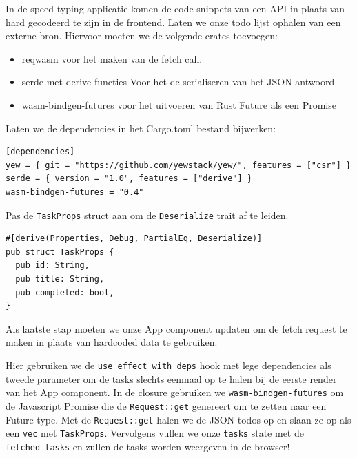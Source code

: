 In de speed typing applicatie komen de code snippets van een API in plaats van hard gecodeerd te
zijn in de frontend. Laten we onze todo lijst ophalen van een externe bron. Hiervoor moeten we de
volgende crates toevoegen:
\begin{itemize}
  \item reqwasm voor het maken van de fetch call.
  \item serde met derive functies Voor het de-serialiseren van het JSON antwoord
  \item wasm-bindgen-futures voor het uitvoeren van Rust Future als een Promise
\end{itemize}

Laten we de dependencies in het Cargo.toml bestand bijwerken:

\begin{verbatim}
[dependencies]
yew = { git = "https://github.com/yewstack/yew/", features = ["csr"] }
serde = { version = "1.0", features = ["derive"] }
wasm-bindgen-futures = "0.4"
\end{verbatim}

Pas de \texttt{TaskProps} struct aan om de \texttt{Deserialize} trait af te leiden.

\begin{verbatim}
#[derive(Properties, Debug, PartialEq, Deserialize)]
pub struct TaskProps {
  pub id: String,
  pub title: String,
  pub completed: bool,
}
\end{verbatim}

Als laatste stap moeten we onze App component updaten om de fetch request te maken in plaats van
hardcoded data te gebruiken.

Hier gebruiken we de \texttt{use_effect_with_deps} hook met lege dependencies als tweede
parameter om de tasks slechts eenmaal op te halen bij de eerste render van het App component. In de
closure gebruiken we \texttt{wasm-bindgen-futures} om de Javascript Promise die de
\texttt{Request::get} genereert om te zetten naar een Future type. Met de
\texttt{Request::get} halen we de JSON todos op en slaan ze op als een
\texttt{vec} met \texttt{TaskProps}. Vervolgens vullen we onze
\texttt{tasks} state met de \texttt{fetched_tasks} en zullen de tasks worden
weergeven in de browser!


